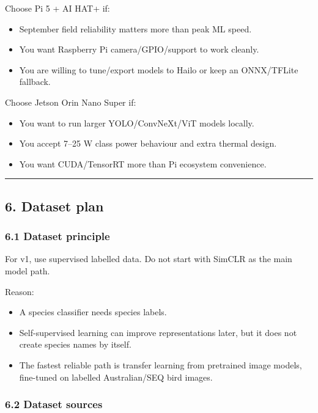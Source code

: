 \documentclass[
  11pt,
]{article}
\providecommand{\tightlist}{%
  \setlength{\itemsep}{0pt}\setlength{\parskip}{0pt}}
\begin{document}
Choose Pi 5 + AI HAT+ if:

\begin{itemize}
\tightlist
\item
  September field reliability matters more than peak ML speed.
\item
  You want Raspberry Pi camera/GPIO/support to work cleanly.
\item
  You are willing to tune/export models to Hailo or keep an ONNX/TFLite
  fallback.
\end{itemize}

Choose Jetson Orin Nano Super if:

\begin{itemize}
\tightlist
\item
  You want to run larger YOLO/ConvNeXt/ViT models locally.
\item
  You accept 7--25 W class power behaviour and extra thermal design.
\item
  You want CUDA/TensorRT more than Pi ecosystem convenience.
\end{itemize}

\begin{center}\rule{0.5\linewidth}{0.5pt}\end{center}

\subsection{6. Dataset plan}\label{dataset-plan}

\subsubsection{6.1 Dataset principle}\label{dataset-principle}

For v1, use supervised labelled data. Do not start with SimCLR as the
main model path.

Reason:

\begin{itemize}
\tightlist
\item
  A species classifier needs species labels.
\item
  Self-supervised learning can improve representations later, but it
  does not create species names by itself.
\item
  The fastest reliable path is transfer learning from pretrained image
  models, fine-tuned on labelled Australian/SEQ bird images.
\end{itemize}

\subsubsection{6.2 Dataset sources}\label{dataset-sources}
\end{document}
